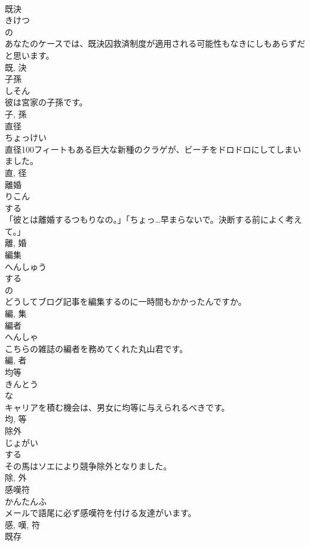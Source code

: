 \documentclass[8pt]{extreport}
\begin{document}
\begin{CJK}{UTF8}{min}
\\	既決	
\\	きけつ	
\\	の 
\\	あなたのケースでは、既決囚救済制度が適用される可能性もなきにしもあらずだと思います。	
\\	既, 決	
\\	子孫	
\\	しそん	
\\	彼は宮家の子孫です。	
\\	子, 孫	
\\	直径	
\\	ちょっけい	
\\	直径100フィートもある巨大な新種のクラゲが、ビーチをドロドロにしてしまいました。	
\\	直, 径	
\\	離婚	
\\	りこん	
\\	する 
\\	「彼とは離婚するつもりなの。」「ちょっ…早まらないで。決断する前によく考えて。」	
\\	離, 婚	
\\	編集	
\\	へんしゅう	
\\	する 
\\	の 
\\	どうしてブログ記事を編集するのに一時間もかかったんですか。	
\\	編, 集	
\\	編者	
\\	へんしゃ	
\\	こちらの雑誌の編者を務めてくれた丸山君です。	
\\	編, 者	
\\	均等	
\\	きんとう	
\\	な 
\\	キャリアを積む機会は、男女に均等に与えられるべきです。	
\\	均, 等	
\\	除外	
\\	じょがい	
\\	する 
\\	その馬はソエにより競争除外となりました。	
\\	除, 外	
\\	感嘆符	
\\	かんたんふ	
\\	メールで語尾に必ず感嘆符を付ける友達がいます。	
\\	感, 嘆, 符	
\\	既存	

\end{CJK}
\end{document}

